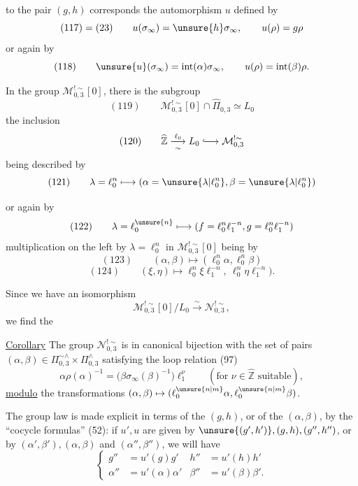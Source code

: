 
to the pair 
$(g,h)$ corresponds the automorphism $u$ defined by
\[
 (117)=(23)\qquad
 u(\sigma_\infty)=\unsure{h}\sigma_\infty,\qquad
 u(\rho)=g\rho
\]
or again by
\[
 (118)\qquad
 \unsure{u}(\sigma_\infty)=\mathrm{int}(\alpha)\sigma_\infty,\qquad
 u(\rho)=\mathrm{int}(\beta)\rho.
\]

In the group $\mathcal M_{0,3}^{!\sim}[0]$, there is the subgroup
\[
 (119)\qquad
 \mathcal M_{0,3}^{!\sim}[0]\cap\widehat{\Pi}_{0,3}\simeq L_0
\]
the inclusion
\[
 (120)\qquad
 \widehat{\mathbb Z}\overset{\ell_0}{\underset{\sim}{\longrightarrow}}
 L_0\lhook\joinrel\longrightarrow\mathcal M_{0,3}^{!\sim}
\]
being described by
\[
 (121)\qquad
 \lambda=\ell_0^n\longmapsto
 (\alpha=\unsure{\lambda|\ell_0^n},
 \beta=\unsure{\lambda|\ell_0^n})
\]

or again by
\[
 (122)\qquad
 \lambda=\ell_0^{\unsure{n}}\longmapsto
 (f=\ell_0^n\ell_1^{-n},g=\ell_0^n\ell_1^{-n})
\]
multiplication  on the left by 
$\lambda=\ell_0^n$ in $\mathcal M_{0,3}^{!\sim}[0]$
being  by
\[
 (123)\qquad
 (\alpha,\beta)\longmapsto(\ell_0^n\alpha,\ell_0^n\beta)
\]
\[
 (124)\qquad
 (\xi,\eta)\longmapsto
 \ell_0^n\xi\ell_1^{-n},\ \ell_0^n\eta\ell_1^{-n}).
\]


Since we have an isomorphism
\[
\mathcal M_{0,3}^{!\sim}[0]/L_0
\xrightarrow{\sim}\mathcal N_{0,3}^{!\sim},
\]
we find the

\uline{Corollary} The group $\mathcal N_{0,3}^{!\sim}$ is in canonical bijection
with the set of pairs
$(\alpha,\beta)\in\Pi_{0,3}^{\sim\wedge}\times\Pi_{0,3}^{\wedge}$
satisfying the loop relation (97)
\[
\alpha\rho(\alpha)^{-1}
=\bigl(\beta\sigma_\infty(\beta)^{-1}\bigr)\ell_1^\nu
\qquad(\text{for }\nu\in\widehat{\mathbb Z}\text{ suitable}),
\]
\uline{modulo} the transformations
$(\alpha,\beta)\mapsto(\ell_0^{\unsure{n|m}}\alpha,\ell_0^{\unsure{n|m}}\beta)$.

The group law  is made explicit in terms of the $(g,h)$, or of the
$(\alpha,\beta)$, by the ``cocycle formulas'' (52): if $u',u$
 are given by
$\unsure{(g',h')},(g,h),(g'',h'')$, or by
$(\alpha',\beta'),(\alpha,\beta)$ and $(\alpha'',\beta'')$, we will have
\[
\tag{125}
\left\{
\begin{aligned}
g''&=u'(g)g'&h''&=u'(h)h'\\
\alpha''&=u'(\alpha)\alpha'&\beta''&=u'(\beta)\beta'.
\end{aligned}
\right.
\]

